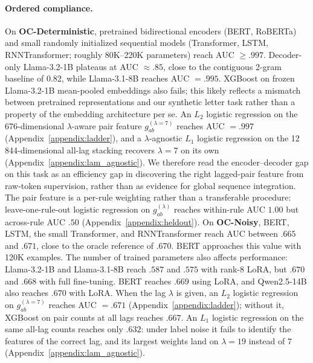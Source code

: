 \documentclass{article} %
\theoremstyle{plain}
\theoremstyle{definition}
\theoremstyle{remark}
\begin{document}
\paragraph{Ordered compliance.}
On \textbf{OC-Deterministic}, pretrained bidirectional encoders (BERT, RoBERTa) and small randomly initialized sequential models (Transformer, LSTM, RNNTransformer; roughly 80K--220K parameters) reach AUC \(\ge .997\). Decoder-only Llama-3.2-1B plateaus at AUC \(\approx .85\), close to the contiguous 2-gram baseline of 0.82, while Llama-3.1-8B reaches AUC $=.995$. XGBoost on frozen Llama-3.2-1B mean-pooled embeddings also fails; this likely reflects a mismatch between pretrained representations and our synthetic letter task rather than a property of the embedding architecture per se. An $L_2$ logistic regression on the 676-dimensional \(\lambda\)-aware pair feature \(g_{ab}^{(\lambda=7)}\) reaches AUC $=.997$ (Appendix~\ref{appendix:ladder}), and a \(\lambda\)-agnostic $L_1$ logistic regression on the 12\,844-dimensional all-lag stacking recovers \(\lambda=7\) on its own (Appendix~\ref{appendix:lam_agnostic}). We therefore read the encoder--decoder gap on this task as an efficiency gap in discovering the right lagged-pair feature from raw-token supervision, rather than as evidence for global sequence integration. The pair feature is a per-rule weighting rather than a transferable procedure: leave-one-rule-out logistic regression on \(g_{ab}^{(\lambda)}\) reaches within-rule AUC $1.00$ but across-rule AUC $.50$ (Appendix~\ref{appendix:heldout}). On \textbf{OC-Noisy}, BERT, LSTM, the small Transformer, and RNNTransformer reach AUC between $.665$ and $.671$, close to the oracle reference of $.670$. BERT approaches this value with 120K examples. The number of trained parameters also affects performance: Llama-3.2-1B and Llama-3.1-8B reach $.587$ and $.575$ with rank-8 LoRA, but $.670$ and $.668$ with full fine-tuning. BERT reaches $.669$ using LoRA, and Qwen2.5-14B also reaches $.670$ with LoRA. 
When the lag $\lambda$ is given, an $L_2$ logistic regression on $g_{ab}^{(\lambda=7)}$ reaches AUC $=.671$ (Appendix~\ref{appendix:ladder}); without it, XGBoost on pair counts at all lags reaches $.667$. An $L_1$ logistic regression on the same all-lag counts reaches only $.632$: under label noise it fails to identify the features of the correct lag, and its largest weights land on $\lambda=19$ instead of $7$ (Appendix~\ref{appendix:lam_agnostic}).
\end{document}
